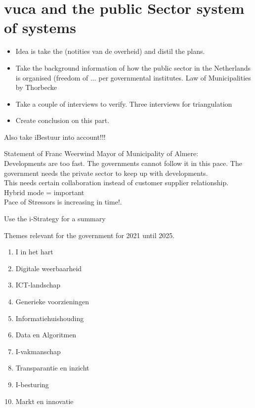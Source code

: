 \chapter{\acrshort{vuca} and the public Sector system of systems}
\label{ch:vucaandpublicsector}

\begin{itemize}
\item{Idea is take the (notities van de overheid) and distil the plans.}
\item{Take the background information of how the public sector in the Netherlands is organised (freedom of ... per governmental institutes. Law of Municipalities by Thorbecke }
\item{Take a couple of interviews to verify. Three interviews for triangulation}
\item{Create conclusion on this part.}
\end{itemize}

\begin{remark}
	Also take iBestuur into account!!!
\end{remark}

Statement of Franc Weerwind Mayor of Municipality of Almere:\\
Developments are too fast. The governments cannot follow it in this pace. The government needs the private sector to keep up with developments.\\
This needs certain collaboration instead of customer supplier relationship.\\
Hybrid mode = important\\
Pace of Stressors is increasing in time!.\\

\begin{remark}
	Use the i-Strategy for a summary \parencite{Digitaleoverheid}
\end{remark}

Themes relevant for the government for 2021 until 2025.

\begin{enumerate}
	\item{I in het hart}
	\item{Digitale weerbaarheid}
	\item{ICT-landschap}
	\item{Generieke voorzieningen}
	\item{Informatiehuishouding}
	\item{Data en Algoritmen}
	\item{I-vakmanschap}
	\item{Transparantie en inzicht}
	\item{I-besturing}
	\item{Markt en innovatie}
\end{enumerate}

